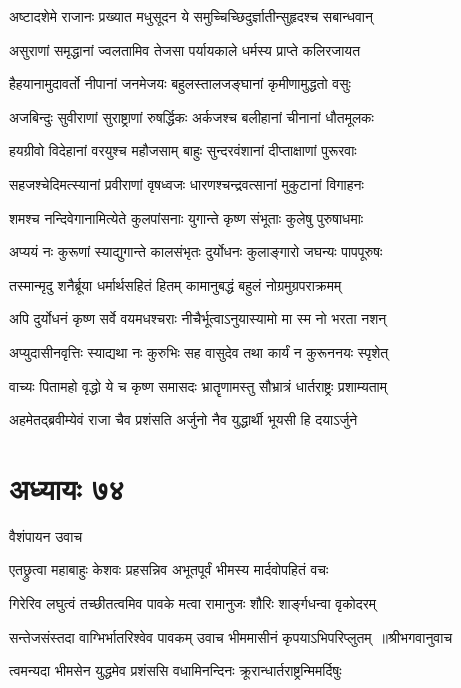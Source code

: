 \twolineshloka
{अष्टादशेमे राजानः प्रख्यात मधुसूदन}
{ये समुच्चिच्छिदुर्ज्ञातीन्सुहृदश्च सबान्धवान्}


\twolineshloka
{असुराणां समृद्धानां ज्वलतामिव तेजसा}
{पर्यायकाले धर्मस्य प्राप्ते कलिरजायत}


\twolineshloka
{हैहयानामुदावर्तो नीपानां जनमेजयः}
{बहुलस्तालजङ्घानां कृमीणामुद्धतो वसुः}


\twolineshloka
{अजबिन्दुः सुवीराणां सुराष्ट्राणां रुषर्द्धिकः}
{अर्कजश्च बलीहानां चीनानां धौतमूलकः}


\twolineshloka
{हयग्रीवो विदेहानां वरयुश्च महौजसाम्}
{बाहुः सुन्दरवंशानां दीप्ताक्षाणां पुरूरवाः}


\twolineshloka
{सहजश्चेदिमत्स्यानां प्रवीराणां वृषध्वजः}
{धारणश्चन्द्रवत्सानां मुकुटानां विगाहनः}


\twolineshloka
{शमश्च नन्दिवेगानामित्येते कुलपांसनाः}
{युगान्ते कृष्ण संभूताः कुलेषु पुरुषाधमाः}


\twolineshloka
{अप्ययं नः कुरूणां स्याद्युगान्ते कालसंभृतः}
{दुर्योधनः कुलाङ्गारो जघन्यः पापपूरुषः}


\twolineshloka
{तस्मान्मृदु शनैर्ब्रूया धर्मार्थसहितं हितम्}
{कामानुबद्धं बहुलं नोग्रमुग्रपराक्रमम्}


\twolineshloka
{अपि दुर्योधनं कृष्ण सर्वे वयमधश्चराः}
{नीचैर्भूत्वाऽनुयास्यामो मा स्म नो भरता नशन्}


\twolineshloka
{अप्युदासीनवृत्तिः स्याद्यथा नः कुरुभिः सह}
{वासुदेव तथा कार्यं न कुरूननयः स्पृशेत्}


\twolineshloka
{वाच्यः पितामहो वृद्धो ये च कृष्ण समासदः}
{भ्रातॄणामस्तु सौभ्रात्रं धार्तराष्ट्रः प्रशाम्यताम्}


\twolineshloka
{अहमेतद्ब्रवीम्येवं राजा चैव प्रशंसति}
{अर्जुनो नैव युद्धार्थी भूयसी हि दयाऽर्जुने}


\chapter{अध्यायः ७४}
\twolineshloka
{वैशंपायन उवाच}
{}


\twolineshloka
{एतछ्रुत्वा महाबाहुः केशवः प्रहसन्निव}
{अभूतपूर्वं भीमस्य मार्दवोपहितं वचः}


\twolineshloka
{गिरेरिव लघुत्वं तच्छीतत्वमिव पावके}
{मत्वा रामानुजः शौरिः शार्ङ्गधन्वा वृकोदरम्}


\threelineshloka
{सन्तेजसंस्तदा वाग्भिर्भातरिश्वेव पावकम्}
{उवाच भीममासीनं कृपयाऽभिपरिप्लुतम् ॥श्रीभगवानुवाच}
{}


\twolineshloka
{त्वमन्यदा भीमसेन युद्धमेव प्रशंससि}
{वधामिनन्दिनः क्रूरान्धार्तराष्ट्रन्मिमर्दिषुः}


